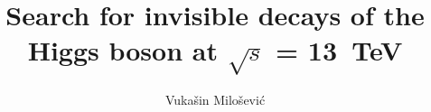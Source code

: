 \documentclass[a4paper,12pt,twoside]{report}
\begin{document}
\title{\Large {\bf Search for invisible decays of the Higgs boson at $\sqrt{s}$ = 13~TeV}\\
 \vspace*{6mm}
}

\author{\large Vuka\v sin Milo\v sevi\' c}



\maketitle
\preface






\body


                 
                  
\end{document}
